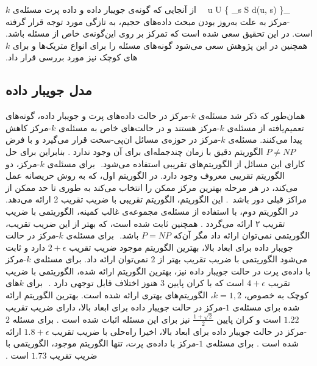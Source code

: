 ‫
‫\max_{u \in U} \{ \min_{s \in S} d(u, s) \}
‫
‫
‫
‫از آنجایی که گونه‌ی جویبار داده و داده پرت مسئله‌ی $k$-مرکز به علت به‌روز بودن مبحث داده‌های حجیم، به تازگی مورد توجه قرار گرفته است.
‫در این تحقیق سعی شده است که تمرکز بر روی این‌گونه‌ی خاص از مسئله باشد.
‫همچنین در این پژوهش سعی می‌شود گونه‌های مسئله را برای انواع متریک‌ها و برای $k$های کوچک نیز مورد بررسی قرار داد.
‫
‫\subsection{مدل جویبار داده}
‫
‫همان‌طور که ذکر شد مسئله‌ی $k$-مرکز در حالت داده‌های پرت و جویبار داده، گونه‌های تعمیم‌یافته از مسئله‌ی $k$-مرکز هستند و در حالت‌های خاص به مسئله‌ی $k$-مرکز کاهش پیدا می‌کنند.
‫مسئله‌ی $k$-مرکز در حوزه‌ی مسائل ان‌پی-سخت قرار می‌گیرد و با فرض $P \neq NP$ الگوریتم دقیق با زمان چندجمله‌ای برای آن وجود ندارد .
‫بنابراین برای حل کارای این مسائل از الگوریتم‌های تقریبی استفاده می‌شود.
‫
‫برای مسئله‌ی $k$-مرکز، دو الگوریتم تقریبی معروف وجود دارد.
‫در الگوریتم اول، که به روش حریصانه عمل می‌کند، در هر مرحله بهترین مرکز ممکن را انتخاب می‌کند به طوری تا حد ممکن از مراکز قبلی دور باشد~.
‫این الگوریتم، الگوریتم تقریبی با ضریب تقریب 2 ارائه می‌دهد.
‫در الگوریتم دوم، با استفاده از مسئله‌ی مجموعه‌ی غالب کمینه، الگوریتمی با ضریب تقریب ۲ ارائه می‌گردد .
‫همچنین ثابت شده است، که بهتر از این ضریب تقریب، الگوریتمی نمی‌توان ارائه داد مگر آن‌که $P = NP$ باشد.
‫
‫برای مسئله‌ی $k$-مرکز در حالت جویبار داده برای ابعاد بالا، بهترین الگوریتم موجود ضریب تقریب $2 + \epsilon$ دارد  و ثابت می‌شود الگوریتمی با ضریب تقریب بهتر از $2$ نمی‌توان ارائه داد. برای مسئله‌ی $k$-مرکز با داده‌ی پرت در حالت جویبار داده نیز، بهترین الگوریتم ارائه شده، الگوریتمی با ضریب تقریب $4 + \epsilon$ است که با کران پایین $3$ هنوز اختلاف قابل توجهی دارد .
‫
‫برای $k$های کوچک به خصوص، $k =1, 2$، الگوریتم‌های بهتری ارائه شده است. بهترین الگوریتم ارائه شده برای مسئله‌ی $1$-مرکز در حالت جویبار داده برای ابعاد بالا، دارای ضریب تقریب $1.22$ است و کران پایین $\frac{1 + \sqrt{2}}{2}$ نیز برای این مسئله اثبات شده است . برای مسئله $2$-مرکز در حالت جویبار داده برای ابعاد بالا، اخیرا راه‌حلی با ضریب تقریب $1.8 + \epsilon$ ارائه شده است . برای مسئله‌ی $1$-مرکز با داده‌ی پرت، تنها الگوریتم موجود، الگوریتمی با ضریب تقریب $1.73$ است .
